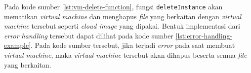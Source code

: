 

Pada kode sumber \ref{lst:vm-delete-function}, fungsi \lstinline{deleteInstance}
akan mematikan \emph{virtual machine} dan menghapus \emph{file} yang berkaitan
dengan \emph{virtual machine} tersebut seperti \emph{cloud image} yang dipakai.
Bentuk implementasi dari \emph{error handling} tersebut dapat dilihat pada kode
sumber \ref{lst:error-handling-example}. Pada kode sumber tersebut, jika terjadi
\emph{error} pada saat membuat \emph{virtual machine}, maka \emph{virtual machine}
tersebut akan dihapus beserta semua \emph{file} yang berkaitan.

